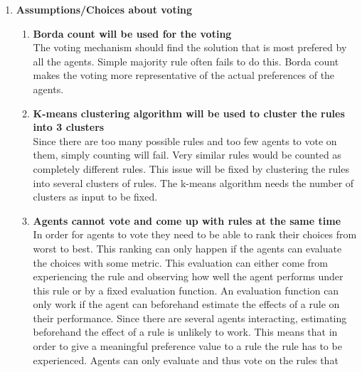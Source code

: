 \documentclass[a4paper]{article}
\begin{document}
\begin{enumerate}
\item \textbf{Assumptions/Choices  about voting} \begin{enumerate}
                                         \item \textbf{Borda count will be used for the voting} \\
                                         The voting mechanism should find the solution that is most prefered by all 
                                         the agents. Simple majority rule often fails to do this. Borda count makes the 
                                         voting more representative of the actual preferences of the agents. 
                                         \item \textbf{K-means clustering algorithm will be used to cluster the 
                                         rules into 3 clusters} \\
                                         Since there are too many possible rules and too few agents to vote on them, simply 
                                         counting will fail. Very similar rules would be counted as completely different rules. 
                                         This issue will be fixed by clustering the rules into several clusters of rules. 
                                         The k-means algorithm needs  the number of clusters as input to be fixed.
                                         \item \textbf{Agents cannot vote and come up with rules at the same time} \\
                                         In order for agents to vote they need to be able to rank their choices from worst 
                                         to best. This ranking can only happen if the agents can evaluate the choices with 
                                         some metric. This evaluation can either come from experiencing the rule and 
                                         observing how well the agent performs under this rule or by a fixed evaluation 
                                         function. An evaluation function can only work if the agent can beforehand 
                                         estimate the effects of a rule on their performance. Since there are several 
                                         agents interacting, estimating beforehand the effect of a rule is unlikely to work. 
                                         This means that in order to give a meaningful preference value to a rule the rule 
                                         has to be experienced. Agents can only evaluate and thus vote on  the rules that 

\end{enumerate}
\end{enumerate}
\end{document}
